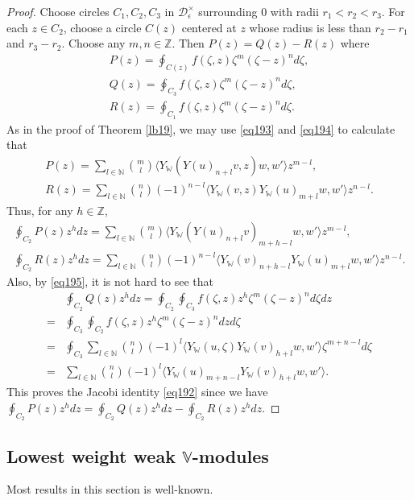 \documentclass[12pt,a4paper,notitlepage]{report}
\theoremstyle{definition}
\theoremstyle{plain}
\newcommand{\mc}{\mathcal}
\newcommand{\bk}[1]{\langle {#1}\rangle}
\newcommand{\Vbb}{\mathbb V}
\newcommand{\Wbb}{\mathbb W}
\newcommand{\Nbb}{\mathbb N}
\newcommand{\Zbb}{\mathbb Z}
\numberwithin{equation}{section}
\begin{document}
\begin{proof}
Choose circles $C_1,C_2,C_3$ in $\mc D_\epsilon^\times$ surrounding $0$ with radii $r_1<r_2<r_3$.  For each $z\in C_2$, choose a circle $C(z)$ centered at $z$ whose radius is less than $r_2-r_1$ and $r_3-r_2$. Choose any $m,n\in\Zbb$. Then $P(z)=Q(z)-R(z)$ where
\begin{gather*}
P(z)=\oint_{C(z)}f(\zeta,z)\zeta^m(\zeta-z)^nd\zeta,\\
Q(z)=\oint_{C_3}f(\zeta,z)\zeta^m(\zeta-z)^nd\zeta,\\
R(z)=\oint_{C_1}f(\zeta,z)\zeta^m(\zeta-z)^nd\zeta.
\end{gather*}
As in the proof of Theorem \ref{lb19}, we may use \eqref{eq193} and \eqref{eq194} to calculate that
\begin{gather*}
P(z)=\sum_{l\in\Nbb}{m\choose l}\bk{Y_\Wbb(Y(u)_{n+l}v,z)w,w'}z^{m-l},\\
R(z)=\sum_{l\in\Nbb}{n\choose l}(-1)^{n-l}\bk{Y_\Wbb(v,z)Y_\Wbb(u)_{m+l}w,w'}z^{n-l}.
\end{gather*}
Thus, for any $h\in\Zbb$,
\begin{gather*}
\oint_{C_2} P(z)z^hdz=\sum_{l\in\Nbb}{m\choose l}\bk{Y_\Wbb(Y(u)_{n+l}v)_{m+h-l}w,w'}z^{m-l},\\
\oint_{C_2}R(z)z^hdz=\sum_{l\in\Nbb}{n\choose l}(-1)^{n-l}\bk{Y_\Wbb(v)_{n+h-l}Y_\Wbb(u)_{m+l}w,w'}z^{n-l}.
\end{gather*}
Also, by \eqref{eq195}, it is not hard to see that
\begin{align*}
&\oint_{C_2} Q(z)z^hdz=\oint_{C_2}\oint_{C_3}f(\zeta,z)z^h\zeta^m(\zeta-z)^nd\zeta dz\\
=&\oint_{C_3}\oint_{C_2}f(\zeta,z)z^h\zeta^m(\zeta-z)^ndz d\zeta\\
=&\oint_{C_3}\sum_{l\in\Nbb}{n\choose l}(-1)^{l}\bk{Y_\Wbb(u,\zeta)Y_\Wbb(v)_{h+l}w,w'}\zeta^{m+n-l}d\zeta\\
=&\sum_{l\in\Nbb}{n\choose l}(-1)^{l}\bk{Y_\Wbb(u)_{m+n-l}Y_\Wbb(v)_{h+l}w,w'}.
\end{align*}
This proves the Jacobi identity \eqref{eq192} since we have $\oint_{C_2}P(z)z^hdz=\oint_{C_2}Q(z)z^hdz-\oint_{C_2}R(z)z^hdz$.
\end{proof}



\subsection*{Lowest weight weak $\Vbb$-modules}

Most results in this section is well-known.
\end{document}

